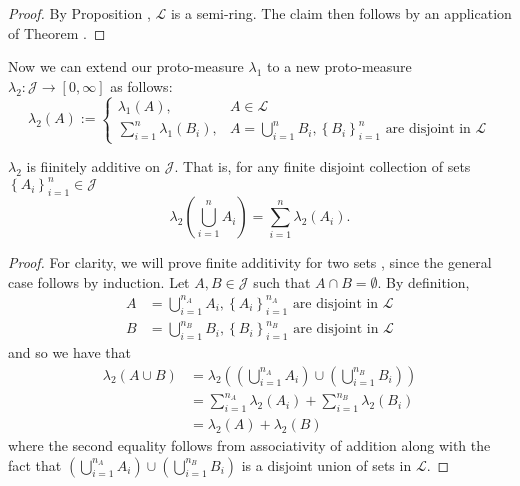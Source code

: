 \begin{proof}
By Proposition , $\mathcal{L}$ is a semi-ring.
The claim then follows by an application of Theorem .
\end{proof}
Now we can extend our proto-measure $\lambda_{1}$ to a new proto-measure
$\lambda_{2}:\mathcal{J}\longrightarrow\left[0,\infty\right]$ as
follows:
\[
\lambda_{2}\left(A\right):=\begin{cases}
\lambda_{1}\left(A\right), & A\in\mathcal{L}\\
\sum_{i=1}^{n}\lambda_{1}\left(B_{i}\right), & A=\bigcup_{i=1}^{n}B_{i},\left\{ B_{i}\right\} _{i=1}^{n}\text{ are disjoint in }\mathcal{L}
\end{cases}
\]

\begin{prop}
\label{prop:ringMeasureFinitelyAdditive}$\lambda_{2}$ is fiinitely
additive on $\mathcal{J}$. That is, for any finite disjoint collection
of sets $\left\{ A_{i}\right\} _{i=1}^{n}\in\mathcal{J}$
\[
\lambda_{2}\left(\bigcup_{i=1}^{n}A_{i}\right)=\sum_{i=1}^{n}\lambda_{2}\left(A_{i}\right).
\]
\end{prop}

\begin{proof}
For clarity, we will prove finite additivity for two sets , since
the general case follows by induction. Let $A,B\in\mathcal{J}$ such
that $A\cap B=\emptyset$. By definition,
\begin{align*}
A & =\bigcup_{i=1}^{n_{A}}A_{i},\left\{ A_{i}\right\} _{i=1}^{n_{A}}\text{ are disjoint in }\mathcal{L}\\
B & =\bigcup_{i=1}^{n_{B}}B_{i},\left\{ B_{i}\right\} _{i=1}^{n_{B}}\text{ are disjoint in }\mathcal{L}
\end{align*}
and so we have that
\begin{align*}
\lambda_{2}\left(A\cup B\right) & =\lambda_{2}\left(\left(\bigcup_{i=1}^{n_{A}}A_{i}\right)\cup\left(\bigcup_{i=1}^{n_{B}}B_{i}\right)\right)\\
 & =\sum_{i=1}^{n_{A}}\lambda_{2}\left(A_{i}\right)+\sum_{i=1}^{n_{B}}\lambda_{2}\left(B_{i}\right)\\
 & =\lambda_{2}\left(A\right)+\lambda_{2}\left(B\right)
\end{align*}
where the second equality follows from associativity of addition along
with the fact that $\left(\bigcup_{i=1}^{n_{A}}A_{i}\right)\cup\left(\bigcup_{i=1}^{n_{B}}B_{i}\right)$
is a disjoint union of sets in $\mathcal{L}$.
\end{proof}

